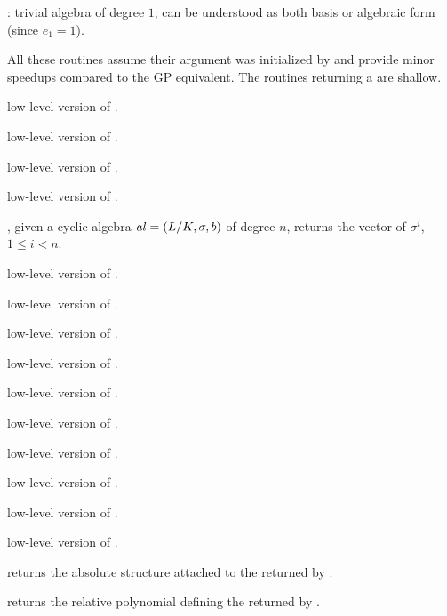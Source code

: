 \item {}: trivial algebra of degree $1$; can be understood
as both basis or algebraic form (since $e_1 = 1$).


All these routines assume their argument was initialized by 
and provide minor speedups compared to the GP equivalent. The routines
returning a  are shallow.

 low-level version of .

 low-level version of .

 low-level version of .

 low-level version of .

, given a cyclic algebra $\hbox{\it al\/} =
(L/K,\sigma,b)$ of degree $n$, returns the vector of $\sigma^i$,
$1 \leq i < n$.

 low-level version of .

 low-level version of .

 low-level version of .

 low-level version of .

 low-level version of .

 low-level version of .

 low-level version of .

 low-level version of .

 low-level version of
.

low-level version of .

 returns the absolute 
structure attached to the  returned by .

  returns the relative polynomial
defining the  returned by .

